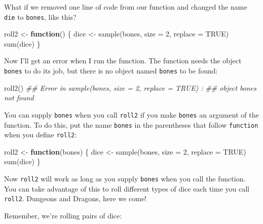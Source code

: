 \documentclass[
  letterpaper,
  DIV=11,
  numbers=noendperiod]{scrbook}
\newenvironment{Shaded}{\begin{snugshade}}{\end{snugshade}}
\newcommand{\AttributeTok}[1]{\textcolor[rgb]{0.40,0.45,0.13}{#1}}
\newcommand{\ConstantTok}[1]{\textcolor[rgb]{0.56,0.35,0.01}{#1}}
\newcommand{\ControlFlowTok}[1]{\textcolor[rgb]{0.00,0.23,0.31}{\textbf{#1}}}
\newcommand{\DecValTok}[1]{\textcolor[rgb]{0.68,0.00,0.00}{#1}}
\newcommand{\DocumentationTok}[1]{\textcolor[rgb]{0.37,0.37,0.37}{\textit{#1}}}
\newcommand{\FunctionTok}[1]{\textcolor[rgb]{0.28,0.35,0.67}{#1}}
\newcommand{\NormalTok}[1]{\textcolor[rgb]{0.00,0.23,0.31}{#1}}
\newcommand{\OtherTok}[1]{\textcolor[rgb]{0.00,0.23,0.31}{#1}}
\begin{document}
What if we removed one line of code from our function and changed the
name \texttt{die} to \texttt{bones}, like this?

\begin{Shaded}
\begin{Highlighting}[]
\NormalTok{roll2 }\OtherTok{\textless{}{-}} \ControlFlowTok{function}\NormalTok{() \{}
\NormalTok{  dice }\OtherTok{\textless{}{-}} \FunctionTok{sample}\NormalTok{(bones, }\AttributeTok{size =} \DecValTok{2}\NormalTok{, }\AttributeTok{replace =} \ConstantTok{TRUE}\NormalTok{)}
  \FunctionTok{sum}\NormalTok{(dice)}
\NormalTok{\}}
\end{Highlighting}
\end{Shaded}

Now I'll get an error when I run the function. The function needs the
object \texttt{bones} to do its job, but there is no object named
\texttt{bones} to be found:

\begin{Shaded}
\begin{Highlighting}[]
\FunctionTok{roll2}\NormalTok{()}
\DocumentationTok{\#\# Error in sample(bones, size = 2, replace = TRUE) : }
\DocumentationTok{\#\#   object \textquotesingle{}bones\textquotesingle{} not found}
\end{Highlighting}
\end{Shaded}

You can supply \texttt{bones} when you call \texttt{roll2} if you make
\texttt{bones} an argument of the function. To do this, put the name
\texttt{bones} in the parentheses that follow \texttt{function} when you
define \texttt{roll2}:

\begin{Shaded}
\begin{Highlighting}[]
\NormalTok{roll2 }\OtherTok{\textless{}{-}} \ControlFlowTok{function}\NormalTok{(bones) \{}
\NormalTok{  dice }\OtherTok{\textless{}{-}} \FunctionTok{sample}\NormalTok{(bones, }\AttributeTok{size =} \DecValTok{2}\NormalTok{, }\AttributeTok{replace =} \ConstantTok{TRUE}\NormalTok{)}
  \FunctionTok{sum}\NormalTok{(dice)}
\NormalTok{\}}
\end{Highlighting}
\end{Shaded}

Now \texttt{roll2} will work as long as you supply \texttt{bones} when
you call the function. You can take advantage of this to roll different
types of dice each time you call \texttt{roll2}. Dungeons and Dragons,
here we come!

Remember, we're rolling pairs of dice:
\end{document}
